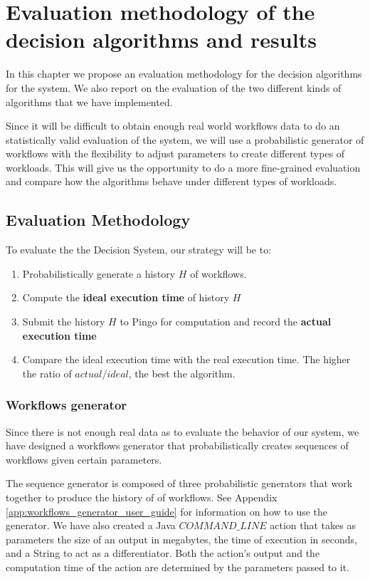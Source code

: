 \chapter{Evaluation methodology of the decision algorithms and results}
\label{chap:evaluation}
In this chapter we propose an evaluation methodology for the decision algorithms for the system.  We also report on the evaluation of the two different kinds of algorithms that we have implemented.

Since it will be difficult to obtain enough real world workflows data to do an statistically valid evaluation of the system, we will use a probabilistic generator of workflows with the flexibility to adjust parameters to create different types of workloads.  This will give us the opportunity to do a more fine-grained evaluation and compare how the algorithms behave under different types of workloads.

\section{Evaluation Methodology}
To evaluate the the Decision System, our strategy will be to:
\begin{enumerate}
\item Probabilistically generate a history $H$ of workflows.
\item Compute the \textbf{ideal execution time} of history $H$
\item Submit the history $H$ to Pingo for computation and record the \textbf{actual execution time}
\item Compare the ideal execution time with the real execution time.  The higher the ratio of $actual/ideal$, the best the algorithm.
\end{enumerate}
\subsection{Workflows generator}
Since there is not enough real data as to evaluate the behavior of our system, we have designed a workflows generator that probabilistically creates sequences of workflows given certain parameters.

The sequence generator is composed of three probabilistic generators that work together to produce the history of of workflows.  See Appendix \ref{app:workflows_generator_user_guide} for information on how to use the generator.  We have also created a Java $COMMAND\_LINE$ action that takes as parameters the size of an output in megabytes, the time of execution in seconds, and a String to act as a differentiator.  Both the action's output and the computation time of the action are determined by the parameters passed to it.

